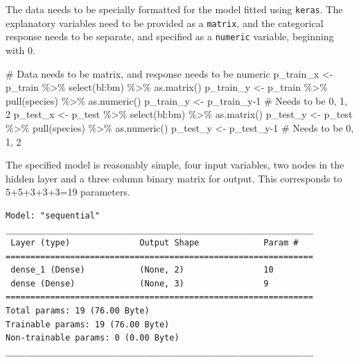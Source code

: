 \documentclass[
  letterpaper,
]{krantz}
\newenvironment{Shaded}{\begin{snugshade}}{\end{snugshade}}
\newcommand{\CommentTok}[1]{\textcolor[rgb]{0.37,0.37,0.37}{#1}}
\newcommand{\DecValTok}[1]{\textcolor[rgb]{0.68,0.00,0.00}{#1}}
\newcommand{\FunctionTok}[1]{\textcolor[rgb]{0.28,0.35,0.67}{#1}}
\newcommand{\NormalTok}[1]{\textcolor[rgb]{0.00,0.23,0.31}{#1}}
\newcommand{\OtherTok}[1]{\textcolor[rgb]{0.00,0.23,0.31}{#1}}
\newcommand{\SpecialCharTok}[1]{\textcolor[rgb]{0.37,0.37,0.37}{#1}}
\begin{document}

The data needs to be specially formatted for the model fitted using
\texttt{keras}. The explanatory variables need to be provided as a
\texttt{matrix}, and the categorical response needs to be separate, and
specified as a \texttt{numeric} variable, beginning with 0.

\begin{Shaded}
\begin{Highlighting}[]
\CommentTok{\# Data needs to be matrix, and response needs to be numeric}
\NormalTok{p\_train\_x }\OtherTok{\textless{}{-}}\NormalTok{ p\_train }\SpecialCharTok{\%\textgreater{}\%}
  \FunctionTok{select}\NormalTok{(bl}\SpecialCharTok{:}\NormalTok{bm) }\SpecialCharTok{\%\textgreater{}\%}
  \FunctionTok{as.matrix}\NormalTok{()}
\NormalTok{p\_train\_y }\OtherTok{\textless{}{-}}\NormalTok{ p\_train }\SpecialCharTok{\%\textgreater{}\%} \FunctionTok{pull}\NormalTok{(species) }\SpecialCharTok{\%\textgreater{}\%} \FunctionTok{as.numeric}\NormalTok{() }
\NormalTok{p\_train\_y }\OtherTok{\textless{}{-}}\NormalTok{ p\_train\_y}\DecValTok{{-}1} \CommentTok{\# Needs to be 0, 1, 2}
\NormalTok{p\_test\_x }\OtherTok{\textless{}{-}}\NormalTok{ p\_test }\SpecialCharTok{\%\textgreater{}\%}
  \FunctionTok{select}\NormalTok{(bl}\SpecialCharTok{:}\NormalTok{bm) }\SpecialCharTok{\%\textgreater{}\%}
  \FunctionTok{as.matrix}\NormalTok{()}
\NormalTok{p\_test\_y }\OtherTok{\textless{}{-}}\NormalTok{ p\_test }\SpecialCharTok{\%\textgreater{}\%} \FunctionTok{pull}\NormalTok{(species) }\SpecialCharTok{\%\textgreater{}\%} \FunctionTok{as.numeric}\NormalTok{() }
\NormalTok{p\_test\_y }\OtherTok{\textless{}{-}}\NormalTok{ p\_test\_y}\DecValTok{{-}1} \CommentTok{\# Needs to be 0, 1, 2}
\end{Highlighting}
\end{Shaded}

The specified model is reasonably simple, four input variables, two
nodes in the hidden layer and a three column binary matrix for output.
This corresponds to 5+5+3+3+3=19 parameters.

\begin{verbatim}
Model: "sequential"
______________________________________________________________
 Layer (type)              Output Shape             Param #   
==============================================================
 dense_1 (Dense)           (None, 2)                10        
 dense (Dense)             (None, 3)                9         
==============================================================
Total params: 19 (76.00 Byte)
Trainable params: 19 (76.00 Byte)
Non-trainable params: 0 (0.00 Byte)
______________________________________________________________
\end{verbatim}
\end{document}
